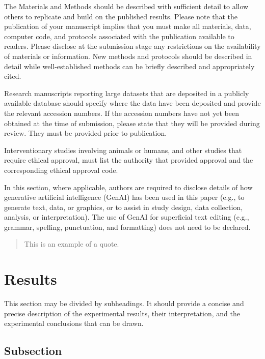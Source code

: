 \documentclass[journal,article,submit,moreauthors]{Definitions/mdpi}
\begin{document}
\iffalse

The Materials and Methods should be described with sufficient detail to allow others to replicate and build on the published results. Please note that the publication of your manuscript implies that you must make all materials, data, computer code, and protocols associated with the publication available to readers. Please disclose at the submission stage any restrictions on the availability of materials or information. New methods and protocols should be described in detail while well-established methods can be briefly described and appropriately cited.

Research manuscripts reporting large datasets that are deposited in a publicly available database should specify where the data have been deposited and provide the relevant accession numbers. If the accession numbers have not yet been obtained at the time of submission, please state that they will be provided during review. They must be provided prior to publication.

Interventionary studies involving animals or humans, and other studies that require ethical approval, must list the authority that provided approval and the corresponding ethical approval code.

In this section, where applicable, authors are required to disclose details of how generative artificial intelligence (GenAI) has been used in this paper (e.g., to generate text, data, or graphics, or to assist in study design, data collection, analysis, or interpretation). The use of GenAI for superficial text editing (e.g., grammar, spelling, punctuation, and formatting) does not need to be declared.

\begin{quote}
This is an example of a quote.
\end{quote}

\section{Results}

This section may be divided by subheadings. It should provide a concise and precise description of the experimental results, their interpretation, and the experimental conclusions that can be drawn.

\subsection{Subsection}
\end{document}
